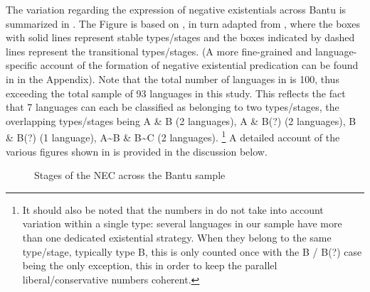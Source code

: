 \documentclass[output=paper,draft,draftmode,colorlinks,citecolor=brown]{langscibook}
\begin{document}
The variation regarding the expression of negative existentials across
Bantu is summarized in . The Figure is based on
\citet[146]{Veselinova2016}, in turn adapted from \citet[6]{Croft1991},
where the boxes with solid lines represent stable types\slash stages and the
boxes indicated by dashed lines represent the transitional types\slash stages. (A
more fine-grained and language-specific account of the formation of
negative existential predication can be found in  in the
Appendix). Note that the total number of languages in  is 100,
thus exceeding the total sample of 93 languages in this study. This reflects the fact that 7 languages can each be classified as belonging to two types/stages, the overlapping types/stages being A \& B (2 languages), A \& B(?) (2 languages), B \& B(?) (1 language), A\textasciitilde{}B \& B\textasciitilde{}C (2 languages).
\footnote{ It should also be noted that the numbers in  do not take into account variation within a single type: several languages in our sample have more than one dedicated existential strategy. When they belong to the same type\slash stage, typically type B, this is only counted once with the B / B(?) case being the only exception, this in order to keep the parallel liberal/conservative numbers coherent.} A detailed account of the various figures shown in 
 is provided in the discussion below.
\begin{center}\begin{figure}[h]%
\caption{Stages of the NEC across the Bantu
sample}\label{fig:01-bantu-nec}\end{figure}\end{center} 
\end{document}
